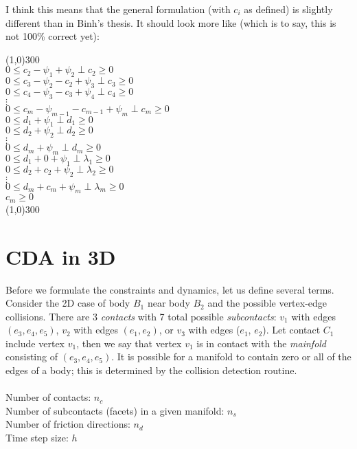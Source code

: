 \documentclass{article}
\begin{document}
I think this means that the general formulation (with $c_i$ as defined) is slightly different than in Binh's thesis.  It should look more like (which is to say, this is not 100\% correct yet): 
\begin{center}
\line(1,0){300}  \\
$ 0 \leq c_2 - \psi_1 + \psi_2 \perp c_2 \geq 0 $ \\
$ 0 \leq c_3 - \psi_2 - c_2 + \psi_3 \perp c_3 \geq 0 $ \\
$ 0 \leq c_4 - \psi_3 - c_3 + \psi_4 \perp c_4 \geq 0 $ \\ 
$\vdots$ \\
$ 0 \leq c_m - \psi_{m-1} - c_{m-1} + \psi_m \perp c_m \geq 0 $ \\ \vspace{8mm}
$ 0 \leq d_1 + \psi_1 \perp d_1 \geq 0 $ \\
$ 0 \leq d_2 + \psi_2 \perp d_2 \geq 0 $ \\
$\vdots$ \\
$ 0 \leq d_m + \psi_m \perp d_m \geq 0 $ \\ \vspace{8mm}
$ 0 \leq d_1 + 0 + \psi_1 \perp \lambda_1 \geq 0 $  \\
$ 0 \leq d_2 + c_2 + \psi_2 \perp \lambda_2 \geq 0 $ \\
$\vdots$ \\
$ 0 \leq d_m + c_m + \psi_m \perp \lambda_m \geq 0 $ \\ \vspace{8mm}
$ c_m \geq 0 $ \\
\line(1,0){300}  
\end{center}

\newpage
\section{CDA in 3D}
Before we formulate the constraints and dynamics, let us define several terms.  Consider the 2D case of body $B_1$ near body $B_2$ and the possible vertex-edge collisions.  There are 3 \emph{contacts} with 7 total possible \emph{subcontacts}: $v_1$ with edges $(e_3, e_4, e_5)$, $v_2$ with edges $(e_1, e_2)$, or $v_3$ with edges ($e_1$, $e_2$).  Let contact $C_1$ include vertex $v_1$, then we say that vertex $v_1$ is in contact with the \emph{mainfold} consisting of $(e_3, e_4, e_5)$.  It is possible for a manifold to contain zero or all of the edges of a body; this is determined by the collision detection routine.  \\ \\
Number of contacts: $n_c$  \\
Number of subcontacts (facets) in a given manifold: $n_s$  \\
Number of friction directions: $n_d$  \\
Time step size: $h$ 
\end{document}

